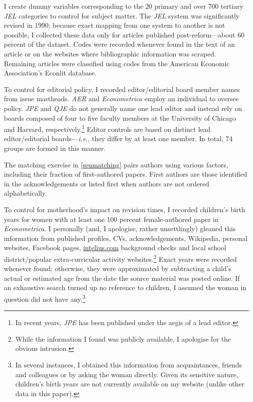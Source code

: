 \begin{appendices}
I create dummy variables corresponding to the 20 primary and over 700 tertiary \emph{JEL} categories to control for subject matter. The \emph{JEL} system was significantly revised in 1990; because exact mapping from one system to another is not possible, I collected these data only for articles published post-reform---about 60 percent of the dataset. Codes were recorded whenever found in the text of an article or on the websites where bibliographic information was scraped. Remaining articles were classified using codes from the American Economic Association's Econlit database.

To control for editorial policy, I recorded editor\slash editorial board member names from issue mastheads. \emph{AER} and \emph{Econometrica} employ an individual to oversee policy. \emph{JPE} and \emph{QJE} do not generally name one lead editor and instead rely on boards composed of four to five faculty members at the University of Chicago and Harvard, respectively.\footnote{In recent years, \emph{JPE} has been published under the aegis of a lead editor.} Editor controls are based on distinct lead editor\slash editorial boards---\emph{i.e.}, they differ by at least one member. In total, 74 groups are formed in this manner.

The matching exercise in \autoref{seumatching} pairs authors using various factors, including their fraction of first-authored papers. First authors are those identified in the acknowledgements or listed first when authors are not ordered alphabetically.

To control for motherhood's impact on revision times, I recorded children's birth years for women with at least one 100 percent female-authored paper in \emph{Econometrica}. I personally (and, I apologise, rather unsettlingly) gleaned this information from published profiles, CVs, acknowledgements, Wikipedia, personal websites, Facebook pages, \href{https://www.intelius.com}{intelius.com} background checks and local school district\slash popular extra-curricular activity websites.\footnote{While the information I found was publicly available, I apologise for the obvious intrusion.} Exact years were recorded whenever found; otherwise, they were approximated by subtracting a child's actual or estimated age from the date the source material was posted online. If an exhaustive search turned up no reference to children, I assumed the woman in question did not have any.\footnote{In several instances, I obtained this information from acquaintances, friends and colleagues or by asking the woman directly. Given its sensitive nature, children's birth years are not currently available on my website (unlike other data in this paper).} 


\end{appendices}
